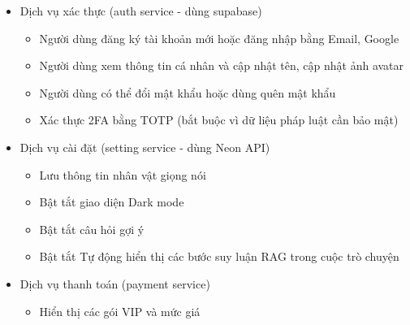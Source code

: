 

\begin{itemize}


\item Dịch vụ xác thực (auth service - dùng supabase)
\begin{itemize}
\item Người dùng đăng ký tài khoản mới hoặc đăng nhập bằng Email, Google
\item Người dùng xem thông tin cá nhân và cập nhật tên, cập nhật ảnh avatar
\item Người dùng có thể đổi mật khẩu hoặc dùng quên mật khẩu
\item Xác thực 2FA bằng TOTP (bắt buộc vì dữ liệu pháp luật cần bảo mật)
\end{itemize}
\item Dịch vụ cài đặt (setting service - dùng Neon API)
\begin{itemize}
\item Lưu thông tin nhân vật giọng nói
\item Bật tắt giao diện Dark mode
\item Bật tắt câu hỏi gợi ý
\item Bật tắt Tự động hiển thị các bước suy luận RAG trong cuộc trò chuyện
\end{itemize}
\item Dịch vụ thanh toán (payment service)
\begin{itemize}
\item Hiển thị các gói VIP và mức giá


\end{itemize}
\end{itemize}
